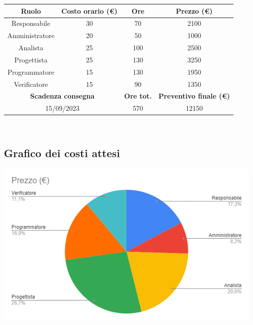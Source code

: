 \documentclass[a4paper, 12pt]{article}
\begin{document}
\begin{tabular}{|c|c|c|c|}
	\hline
	\textbf{Ruolo}                                   & \textbf{Costo orario (\euro)} & \textbf{Ore}                       & \textbf{Prezzo (\euro)} \\
	\hline
	Responsabile                                     & 30                            & 70                                 & 2100                    \\
	\hline
	Amministratore                                   & 20                            & 50                                 & 1000                    \\
	\hline
	Analista                                         & 25                            & 100                                & 2500                    \\
	\hline
	Progettista                                      & 25                            & 130                                & 3250                    \\
	\hline
	Programmatore                                    & 15                            & 130                                & 1950                    \\
	\hline
	Verificatore                                     & 15                            & 90                                 & 1350                    \\
	\hline\hline
	\multicolumn{2}{|c|}{\textbf{Scadenza consegna}} & \textbf{Ore tot.}             & \textbf{Preventivo finale (\euro)}                           \\
	\hline
	\multicolumn{2}{|c|}{15/09/2023}                 & 570                           & 12150                                                        \\
	\hline
\end{tabular}\\[8pt]

\subsection{Grafico dei costi attesi}
\includegraphics{grafico_costi.png}
\end{document}
